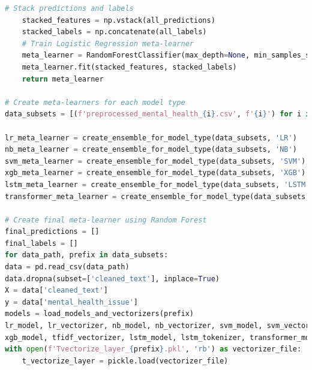 \begin{tcolorbox}[colback=gray!5!white, colframe=gray!80!black, boxrule=0.5pt, title=Hierarchical Ensemble Model 2] 
    \begin{lstlisting}[language=Python]
    # Stack predictions and labels
    stacked_features = np.vstack(all_predictions)
    stacked_labels = np.concatenate(all_labels)
    # Train Logistic Regression meta-learner
    meta_learner = RandomForestClassifier(max_depth=None, min_samples_split=20, min_samples_leaf=1, max_features='sqrt', bootstrap=False, random_state=42)
    meta_learner.fit(stacked_features, stacked_labels)
    return meta_learner

# Create meta-learners for each model type
data_subsets = [(f'preprocessed_mental_health_{i}.csv', f'{i}') for i in range(1, 7)]

lr_meta_learner = create_ensemble_for_model_type(data_subsets, 'LR')
nb_meta_learner = create_ensemble_for_model_type(data_subsets, 'NB')
svm_meta_learner = create_ensemble_for_model_type(data_subsets, 'SVM')
xgb_meta_learner = create_ensemble_for_model_type(data_subsets, 'XGB')
lstm_meta_learner = create_ensemble_for_model_type(data_subsets, 'LSTM')
transformer_meta_learner = create_ensemble_for_model_type(data_subsets, 'Transformer')

# Create final meta-learner using Random Forest
final_predictions = []
final_labels = []
for data_path, prefix in data_subsets:
data = pd.read_csv(data_path)
data.dropna(subset=['cleaned_text'], inplace=True)
X = data['cleaned_text']
y = data['mental_health_issue']
models = load_models_and_vectorizers(prefix)
lr_model, lr_vectorizer, nb_model, nb_vectorizer, svm_model, svm_vectorizer, \
xgb_model, tfidf_vectorizer, lstm_model, lstm_tokenizer, transformer_model = models
with open(f'Tvectorize_layer_{prefix}.pkl', 'rb') as vectorizer_file:
    t_vectorize_layer = pickle.load(vectorizer_file)
\end{lstlisting}
\end{tcolorbox}
